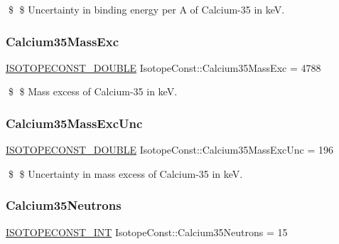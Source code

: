 \$ \$ Uncertainty in binding energy per A of Calcium-\/35 in keV. \mbox{\label{group___isotope_const-_calcium-_ca35_gac5df6c354a7b6b8632da139f4c276250}} 
\subsubsection{\texorpdfstring{Calcium35\+Mass\+Exc}{Calcium35MassExc}}
{\footnotesize\ttfamily \mbox{\hyperlink{group___isotope_const-_macros_ga8f45a7272ce02c0b4c65c44636ed719a}{I\+S\+O\+T\+O\+P\+E\+C\+O\+N\+S\+T\+\_\+\+D\+O\+U\+B\+LE}} Isotope\+Const\+::\+Calcium35\+Mass\+Exc = 4788}

\$ \$ Mass excess of Calcium-\/35 in keV. \mbox{\label{group___isotope_const-_calcium-_ca35_ga3776ffc4043baf45c42ef740dc04b41f}} 
\subsubsection{\texorpdfstring{Calcium35\+Mass\+Exc\+Unc}{Calcium35MassExcUnc}}
{\footnotesize\ttfamily \mbox{\hyperlink{group___isotope_const-_macros_ga8f45a7272ce02c0b4c65c44636ed719a}{I\+S\+O\+T\+O\+P\+E\+C\+O\+N\+S\+T\+\_\+\+D\+O\+U\+B\+LE}} Isotope\+Const\+::\+Calcium35\+Mass\+Exc\+Unc = 196}

\$ \$ Uncertainty in mass excess of Calcium-\/35 in keV. \mbox{\label{group___isotope_const-_calcium-_ca35_gabffbefd63b1c4713d1fe8a0bc888c1e0}} 
\subsubsection{\texorpdfstring{Calcium35\+Neutrons}{Calcium35Neutrons}}
{\footnotesize\ttfamily \mbox{\hyperlink{group___isotope_const-_macros_ga5f18360b3e99483a35c32d789e62621c}{I\+S\+O\+T\+O\+P\+E\+C\+O\+N\+S\+T\+\_\+\+I\+NT}} Isotope\+Const\+::\+Calcium35\+Neutrons = 15}

